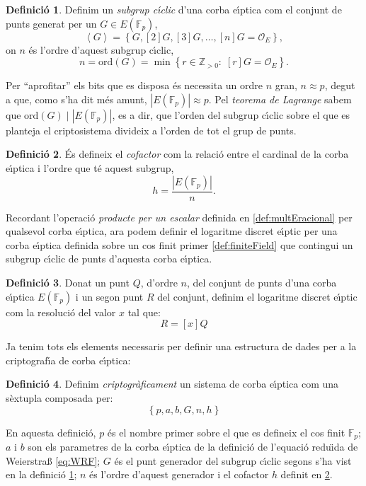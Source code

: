 \documentclass[12pt,twoside,catalan,a4paper]{book}%
\numberwithin{figure}{section}		%
\theoremstyle{definition}   			%
\newtheorem{defi}{Definici\'o}[chapter]%
\def\ce{corba e\lgem{}\'{\i}ptica}%
\def\cf{cos finit}%
\def\sgc{subgrup c\'{\i}clic}%
\def\ecdlp{logaritme discret e\lgem{}\'{\i}ptic}%
\newcommand{\Z}{\ensuremath{\mathbb{Z}}}%
\newcommand{\Fp}{\ensuremath{\mathbb{F}_p}}%
\newcommand{\EFp}{\ensuremath{E(\mathbb{F}_p)}}%
\theoremstyle{saltolinea}   			%
\begin{document}
\begin{defi}\label{def:ciclic} Definim un \emph{subgrup c\'{\i}clic} d'una \ce{} com el conjunt de punts generat per un $G\in E(\Fp)$,
\begin{equation}\left\langle G\right\rangle = \left\{ G,[2]G,[3]G,\ldots,[n]G=\mathcal{O}_{E} \right\},\end{equation}
on $n$ \'es l'ordre d'aquest subgrup c\'{\i}clic, 
$$n=\mathrm{ord}(G)=\min\left\{r\in\Z_{>0}:\;[r]G=\mathcal{O}_{E}\right\}.$$
\end{defi}
Per ``aprofitar'' els bits que es disposa \'es necessita un ordre $n$ gran, $n\approx p$, degut a que, como s'ha dit m\'es amunt, $\left|E(\Fp)\right|\approx p$. Pel \emph{teorema de Lagrange} sabem que $\mathrm{ord}(G)\mid\left|E(\Fp)\right|$, es a dir, que l'orden del \sgc{} sobre el que es planteja el criptosistema divideix a l'orden de tot el grup de punts.
\begin{defi}\label{def:cofactor} \'Es defineix el \emph{cofactor} com la relaci\'o entre el cardinal de la \ce{} i l'ordre que t\'e aquest subgrup,
\begin{equation}h=\frac{\left|E(\Fp)\right|}{n}.\end{equation}
\end{defi}

Recordant l'operaci\'o \emph{producte per un escalar} definida en \ref{def:multEracional} per qualsevol \ce{}, ara podem definir el \ecdlp{} per una \ce{} definida sobre un \cf{} primer \ref{def:finiteField} que contingui un \sgc{} de punts d'aquesta \ce{}.

\begin{defi}\label{def:ecdlp}
Donat un punt $Q$, d'ordre $n$, del conjunt de punts d'una \ce{} \EFp{} i un segon punt $R$ del conjunt, definim el logaritme discret e\lgem{}\'{\i}ptic com la resoluci\'o del valor $x$ tal que:
\begin{equation}
 R = \left[x\right]Q
\end{equation}
\end{defi}

Ja tenim tots els elements necessaris per definir una estructura de dades per a la criptograf\'{\i}a de \ce{}:

\begin{defi}\label{def:tupla}
Definim \emph{criptogr\`aficament} un sistema de{} \ce{} com una s\`extupla composada per:
	\begin{equation}
	\left\{ p,a,b,G,n,h\right\}
	\end{equation}
\end{defi}
En aquesta definici\'o, $p$ \'es el nombre primer sobre el que es defineix el \cf{} $\Fp$; $a$ i $b$ son els parametres de la \ce{} de la definici\'o de l'equaci\'o redu\"{\i}da de Weierstra\ss{} \eqref{eq:WRF}; $G$ \'es el punt generador del \sgc{} segons s'ha vist en la definici\'o \ref{def:ciclic}; $n$ \'es l'ordre d'aquest generador i el cofactor $h$ definit en \ref{def:cofactor}.
\end{document}
